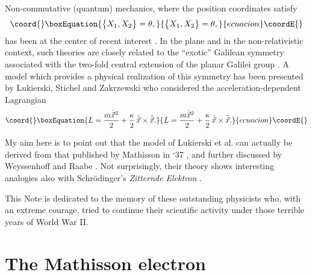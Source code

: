 \documentclass[a4paper,11pt]{article}
\let\ssection=\section
\renewcommand{\section}{\setcounter{equation}{0}\ssection}
\providecommand{\vx}{{\vec x}}
\def\vx{{\vec x}}
\begin{document}
Non-commutative (quantum) mechanics, where the position
coordinates satisfy
\begin{equation}\coord{}\boxEquation{
	\big\{X_{1}, X_{2}\big\}=\theta,
\label{NCpos}
}{
	\big\{X_{1}, X_{2}\big\}=\theta,
}{ecuacion}\coordE{}\end{equation}
has been at the center of recent interest \cite{NCQM}.
In the plane and in the non-relativistic context,
such theories are closely related to the
``exotic'' Galilean symmetry associated with the
two-fold central extension of the planar Galilei
group \cite{exotic}.
A model which provides a physical realization
of this symmetry has been presented by Lukierski,
Stichel and Zakrzewski \cite{LSZ} who considered
the acceleration-dependent Lagrangian
\begin{equation}\coord{}\boxEquation{
     L=
     \frac{m\dot{\vx}^2}{2}
     +
     \frac{\kappa}{2}\,\dot{\vx}\times\ddot{\vx}.
     \label{LSZlag}
}{
     L=
     \frac{m\dot{\vx}^2}{2}
     +
     \frac{\kappa}{2}\,\dot{\vx}\times\ddot{\vx}.
     }{ecuacion}\coordE{}\end{equation}

My aim here is to point out that the
model of Lukierski et al. can actually be derived
from that published by Mathisson in `37
\cite{Mathisson}, and further discussed by Weyssenhoff
and Raabe \cite{WeyRaa}.
Not surprisingly, their theory shows interesting analogies also
with Schr\"odinger's {\it Zitternde Elektron} \cite{Schr}.

This Note is dedicated
to the memory of these outstanding physicists who,
with an extreme courage, tried  to continue
their scientific activity
under those terrible years of World War II.


\section{The Mathisson electron}\label{Mathisson}
\end{document}
